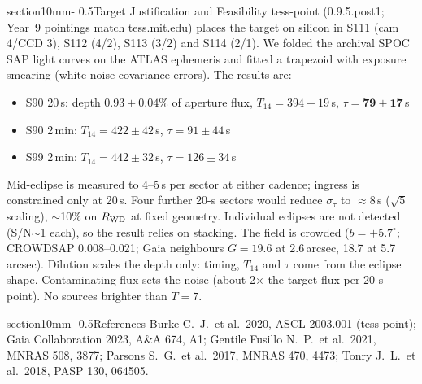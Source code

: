 \documentclass[letterpaper,11pt]{article}
\makeatletter
\renewcommand{\section}{\@startsection%
{section}{1}{0mm}{-\baselineskip}%
{0.5\baselineskip}{\normalfont\Large\bfseries}}%
\makeatother
\begin{document}
\section{Target Justification and Feasibility}
tess-point (0.9.5.post1; Year~9 pointings match tess.mit.edu) places the target on silicon in S111 (cam 4/CCD 3), S112 (4/2), S113 (3/2) and S114 (2/1). We folded the archival SPOC SAP light curves on the ATLAS ephemeris and fitted a trapezoid with exposure smearing (white-noise covariance errors). The results are:
\begin{itemize}\itemsep0pt
\item S90 20\,s: depth $0.93\pm0.04$\% of aperture flux, $T_{14}=394\pm19$\,s, $\tau=\mathbf{79\pm17}$\,s
\item S90 2\,min: $T_{14}=422\pm42$\,s, $\tau=91\pm44$\,s
\item S99 2\,min: $T_{14}=442\pm32$\,s, $\tau=126\pm34$\,s
\end{itemize}
Mid-eclipse is measured to 4--5\,s per sector at either cadence; ingress is constrained only at 20\,s. Four further 20-s sectors would reduce $\sigma_\tau$ to $\approx$8\,s ($\sqrt{5}$ scaling), $\sim$10\% on $R_{\rm WD}$ at fixed geometry. Individual eclipses are not detected (S/N$\sim$1 each), so the result relies on stacking. The field is crowded ($b=+5.7^\circ$; CROWDSAP 0.008--0.021; Gaia neighbours $G=19.6$ at 2.6\,arcsec, 18.7 at 5.7\,arcsec). Dilution scales the depth only: timing, $T_{14}$ and $\tau$ come from the eclipse shape. Contaminating flux sets the noise (about 2$\times$ the target flux per 20-s point). No sources brighter than $T=7$.

\section{References}
{\small Burke C.~J.\ et al.\ 2020, ASCL 2003.001 (tess-point);
Gaia Collaboration 2023, A\&A 674, A1;
Gentile Fusillo N.~P.\ et al.\ 2021, MNRAS 508, 3877;
Parsons S.~G.\ et al.\ 2017, MNRAS 470, 4473;
Tonry J.~L.\ et al.\ 2018, PASP 130, 064505.}
\end{document}

